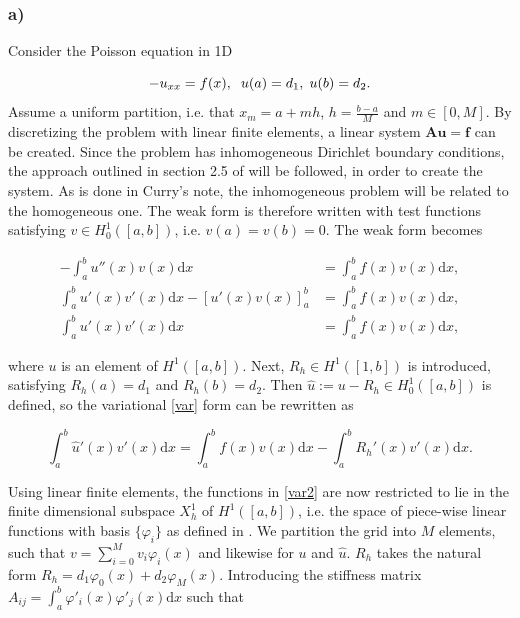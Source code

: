 
\subsubsection{a)}

Consider the Poisson equation in 1D

\begin{equation}
\label{task5Poisson}
    -u_{xx} = f(x), \hspace{2mm} u(a) = d_1, \hspace{1mm} u(b) = d_2.
\end{equation}
Assume a uniform partition, i.e. that $x_m = a + mh$, $h = \frac{b-a}{M}$ and $m \in [0,M]$. By discretizing the problem with linear finite elements, a linear system $\mathbf{Au} = \mathbf{f}$ can be created. Since the problem has inhomogeneous Dirichlet boundary conditions, the approach outlined in section 2.5 of \cite{Curry} will be followed, in order to create the system.  
As is done in Curry's note, the inhomogeneous problem will be related to the homogeneous one. The weak form is therefore written with test functions satisfying $v \in H^1_0([a,b])$, i.e. $v(a) = v(b) =0$. The weak form becomes

\begin{align}
    -\int_a^bu''(x)v(x)\mathrm{d}x &= \int_a^bf(x)v(x)\mathrm{d}x, \nonumber \\
    \int_a^bu'(x)v'(x)\mathrm{d}x - [u'(x)v(x)]_a^b &= \int_a^bf(x)v(x)\mathrm{d}x, \nonumber \\
    \int_a^bu'(x)v'(x)\mathrm{d}x &= \int_a^bf(x)v(x)\mathrm{d}x,
    \label{var}
\end{align}

\noindent where $u$ is an element of $H^1([a,b])$. Next, $R_h \in H^1([1,b])$ is introduced, satisfying $R_h(a) = d_1$ and $R_h(b) = d_2$. Then $\hat{u} := u - R_h \in H^1_0([a,b])$ is defined, so the variational \eqref{var} form can be rewritten as 

\begin{equation}
    \int_a^b\hat{u}'(x)v'(x)\mathrm{d}x = \int_a^bf(x)v(x)\mathrm{d}x - \int_a^bR_h'(x) v'(x) \mathrm{d}x.
\label{var2}
\end{equation}

\noindent Using linear finite elements, the functions in \eqref{var2} are now restricted to lie in the finite dimensional subspace $X_h^1$ of $H^1([a,b])$, i.e. the space of piece-wise linear functions with basis $\{\varphi_i\}$ as defined in \cite{Curry}. We partition the grid into $M$ elements, such that $v = \sum_{i = 0}^{M}v_i \varphi_i(x)$ and likewise for $u$ and $\hat{u}$. $R_h$ takes the natural form $R_h = d_1 \varphi_0(x) + d_2 \varphi_M(x)$. Introducing the stiffness matrix $A_{ij} = \int_a^b \varphi'_i(x) \varphi'_j(x) \mathrm{d}x$  such that 

